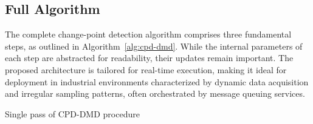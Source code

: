 \subsection{Full Algorithm}
The complete change-point detection algorithm comprises three fundamental steps, as outlined in Algorithm~\ref{alg:cpd-dmd}. While the internal parameters of each step are abstracted for readability, their updates remain important. The proposed architecture is tailored for real-time execution, making it ideal for deployment in industrial environments characterized by dynamic data acquisition and irregular sampling patterns, often orchestrated by message queuing services.

\begin{algorithm}
    \caption{Single pass of CPD-DMD procedure}\label{alg:cpd-dmd}
    \begin{algorithmic}[1]

    \end{algorithmic}
\end{algorithm}

